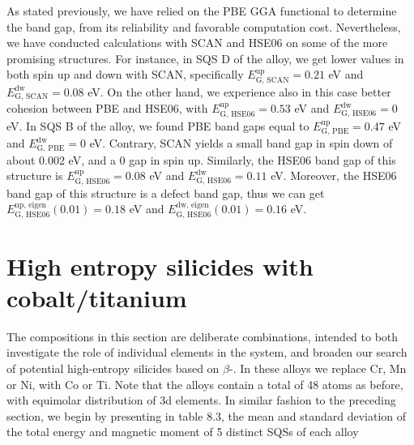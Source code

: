 As stated previously, we have relied on the PBE GGA functional to determine the band gap, from its reliability and favorable computation cost. Nevertheless, we have conducted calculations with SCAN and HSE06 on some of the more promising structures. For instance, in SQS D of the  alloy, we get lower values in both spin up and down with SCAN, specifically $E_\text{G, SCAN} ^\text{up}= 0.21$ eV and $E_\text{G, SCAN} ^\text{dw} = 0.08$ eV. On the other hand, we experience also in this case better cohesion between PBE and HSE06, with $E_\text{G, HSE06} ^\text{up} = 0.53$ eV and $E_\text{G, HSE06} ^\text{dw} = 0$ eV. In SQS B of the  alloy, we found PBE band gaps equal to $E_\text{G, PBE} ^\text{up} = 0.47$ eV and $E_\text{G, PBE} ^\text{dw} = 0$ eV. Contrary, SCAN yields a small band gap in spin down of about 0.002 eV, and a 0 gap in spin up. Similarly, the HSE06 band gap of this structure is $E_\text{G, HSE06} ^\text{up} = 0.08$ eV and $E_\text{G, HSE06} ^\text{dw} = 0.11$ eV. Moreover, the HSE06 band gap of this structure is a defect band gap, thus we can get $E_\text{G, HSE06} ^\text{up, eigen}(0.01) = 0.18$ eV and $E_\text{G, HSE06} ^\text{dw, eigen}(0.01) = 0.16$ eV. 

\newpage
\section{High entropy silicides with cobalt/titanium}

The compositions in this section are deliberate combinations, intended to both investigate the role of individual elements in the  system, and broaden our search of potential high-entropy silicides based on $\beta$-. In these alloys we replace Cr, Mn or Ni, with Co or Ti. Note that the alloys contain a total of 48 atoms as before, with equimolar distribution of 3d elements. In similar fashion to the preceding section, we begin by presenting in table 8.3, the mean and standard deviation of the total energy and magnetic moment of 5 distinct SQSs of each alloy

